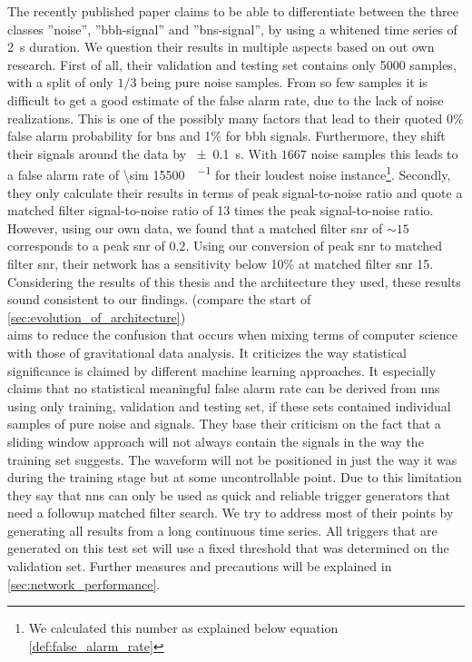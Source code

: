 The recently published paper \cite{bns_network} claims to be able to differentiate between the three classes ''noise'', ''\gls{bbh}-signal'' and ''\gls{bns}-signal'', by using a whitened time series of \SI{2}{\s} duration. We question their results in multiple aspects based on out own research. First of all, their validation and testing set contains only 5000 samples, with a split of only $1/3$ being pure noise samples. From so few samples it is difficult to get a good estimate of the false alarm rate, due to the lack of noise realizations. This is one of the possibly many factors that lead to their quoted 0\% false alarm probability for \gls{bns} and 1\% for \gls{bbh} signals. Furthermore, they shift their signals around the data by \SI{\pm 0.1}{\s}. With $1667$ noise samples this leads to a false alarm rate of \SI[per-mode=fraction]{\sim 15500}{\samples\per\month} for their loudest noise instance\footnote{We calculated this number as explained below equation \eqref{def:false_alarm_rate}}. Secondly, they only calculate their results in terms of peak signal-to-noise ratio and quote a matched filter signal-to-noise ratio of 13 times the peak signal-to-noise ratio. However, using our own data, we found that a matched filter \gls{snr} of $\sim 15$ corresponds to a peak \gls{snr} of $0.2$. Using our conversion of peak \gls{snr} to matched filter \gls{snr}, their network has a sensitivity below 10\% at matched filter \gls{snr} 15. Considering the results of this thesis and the architecture they used, these results sound consistent to our findings. (compare the start of \autoref{sec:evolution_of_architecture})\smallskip\\
\cite{cnn_magiacal_bullet} aims to reduce the confusion that occurs when mixing terms of computer science with those of gravitational data analysis. It criticizes the way statistical significance is claimed by different machine learning approaches. It especially claims that no statistical meaningful false alarm rate can be derived from \gls{nns} using only training, validation and testing set, if these sets contained individual samples of pure noise and signals. They base their criticism on the fact that a sliding window approach will not always contain the signals in the way the training set suggests. The waveform will not be positioned in just the way it was during the training stage but at some uncontrollable point. Due to this limitation they say that \gls{nns} can only be used as quick and reliable trigger generators that need a followup matched filter search. We try to address most of their points by generating all results from a long continuous time series. All triggers that are generated on this test set will use a fixed threshold that was determined on the validation set. Further measures and precautions will be explained in \autoref{sec:network_performance}.\\
